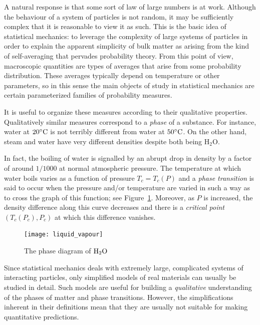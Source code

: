 A natural response is that some sort of law of large numbers
is at work. Although the behaviour of a system of particles is not random, it may
be sufficiently complex that it is reasonable to view it as such.
This is the basic idea of statistical mechanics: to leverage the complexity of
large systems of particles in order to explain the apparent simplicity of bulk
matter as arising from the kind of self-averaging that pervades probability
theory. From this point of view, macroscopic quantities are types of averages that
arise from some probability distribution. These averages typically depend on
temperature or other parameters, so in this sense the main objects of study in
statistical mechanics are certain parameterized families of probability measures.

It is useful to organize these measures according to their qualitative properties.
Qualitatively similar measures correspond to a \emph{phase} of a substance.
For instance, water at $20^\circ{\rm C}$ is not terribly different from water at
$50^\circ{\rm C}$. On the other hand, steam and water have very different densities despite
both being $\mathrm{H_2O}$.

In fact, the boiling of water is signalled by an abrupt drop in density by a factor
of around $1/1000$ at normal atmospheric pressure. The temperature at which water
boils varies as a function of pressure $T_c = T_c(P)$ and a \emph{phase transition}
is said to occur when the pressure and/or temperature are varied in such a way as to
cross the graph of this function; see Figure~\ref{fig:liquid-vapour}.
Moreover, as $P$ is increased, the density difference along this curve decreases and
there is a \emph{critical point} $(T_c(P_c), P_c)$ at which this difference vanishes.

\begin{figure}
\centering
\label{fig:liquid-vapour}
\texttt{[image: liquid\_vapour]}
\caption[Phase diagram of $\rm H_2 O$]{The phase diagram of $\rm H_2 O$}
\end{figure}

Since statistical mechanics deals with extremely large, complicated systems of
interacting particles, only simplified models of real materials can usually be
studied in detail. Such models are useful for building a
\emph{qualitative} understanding of the phases of matter and phase transitions.
However, the simplifications inherent in their definitions mean that they are
usually not suitable for making quantitative predictions.

